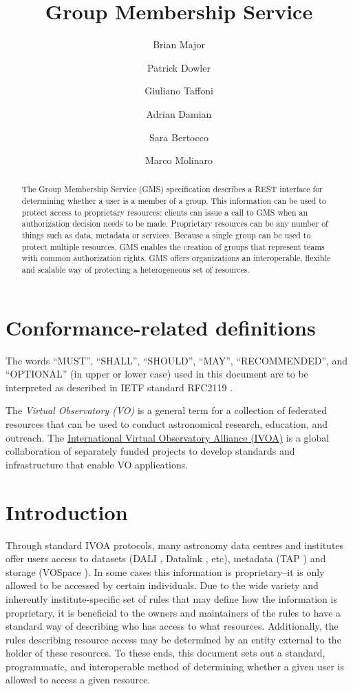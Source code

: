 \documentclass[11pt,a4paper]{ivoa}
\title{Group Membership Service}
\author{Brian Major}
\author{Patrick Dowler}
\author{Giuliano Taffoni}
\author{Adrian Damian}
\author{Sara Bertocco}
\author{Marco Molinaro}
\begin{document}
\begin{abstract}

The Group Membership Service (GMS) specification describes a REST interface for determining whether a user is a member of a group.  This information can be used to protect access to proprietary resources: clients can issue a call to GMS when an authorization decision needs to be made.  Proprietary resources can be any number of things such as data, metadata or services.  Because a single group can be used to protect multiple resources, GMS enables the creation of groups that represent teams with common authorization rights.  GMS offers organizations an interoperable, flexible and scalable way of protecting a heterogeneous set of resources.

\end{abstract}

%
%

\section*{Conformance-related definitions}

The words ``MUST'', ``SHALL'', ``SHOULD'', ``MAY'', ``RECOMMENDED'', and
``OPTIONAL'' (in upper or lower case) used in this document are to be
interpreted as described in IETF standard RFC2119 \citep{std:RFC2119}.

The \emph{Virtual Observatory (VO)} is a
general term for a collection of federated resources that can be used
to conduct astronomical research, education, and outreach.
The \href{http://www.ivoa.net}{International
Virtual Observatory Alliance (IVOA)} is a global
collaboration of separately funded projects to develop standards and
infrastructure that enable VO applications.


\section{Introduction}

Through standard IVOA protocols, many astronomy data centres and institutes offer users access to datasets (DALI \citep{std:DALI}, Datalink \citep{std:Datalink}, etc), metadata (TAP \citep{std:TAP}) and storage (VOSpace \citep{std:VOSpace}).  In some cases this information is proprietary--it is only allowed to be accessed by certain individuals.  Due to the wide variety and inherently institute-specific set of rules that may define how the information is proprietary, it is beneficial to the owners and maintainers of the rules to have a standard way of describing who has access to what resources.  Additionally, the rules describing resource access may be determined by an entity external to the holder of these resources.  To these ends, this document sets out a standard, programmatic, and interoperable method of determining whether a given user is allowed to access a given resource.
\end{document}
